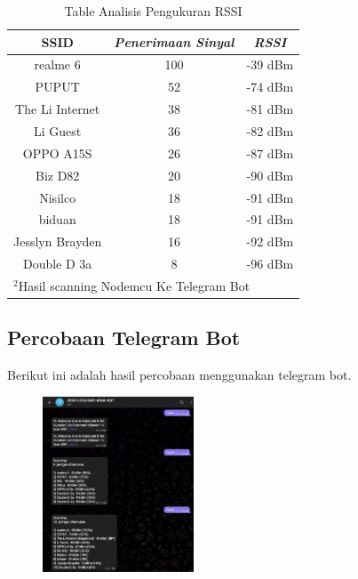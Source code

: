 \documentclass[conference]{IEEEtran}
\begin{document}
 \begin{table}[htbp]
    \caption{Table Analisis Pengukuran RSSI}
    \begin{center}
    \begin{tabular}{|c|c|c|}
        \hline
    \textbf{SSID} &  \textbf{\textit{Penerimaan Sinyal}}& \textbf{\textit{RSSI}} \\
    \hline
    realme 6 & 100 & -39 dBm   \\
    \hline
    PUPUT & 52 & -74 dBm   \\
    \hline
    The Li Internet & 38 & -81 dBm   \\
    \hline
    Li Guest  & 36 & -82 dBm   \\
    \hline
    OPPO A15S  & 26 & -87 dBm   \\
    \hline
    Biz D82  & 20 & -90 dBm   \\
    \hline
    Nisilco  & 18 & -91 dBm   \\
    \hline
    biduan  & 18 & -91 dBm   \\
    \hline
    Jesslyn Brayden  & 16 & -92 dBm   \\
    \hline
    Double D 3a  & 8 & -96 dBm   \\
    \hline

    \multicolumn{3}{l}{$^{\mathrm{2}}$Hasil scanning Nodemcu Ke Telegram Bot}
    \end{tabular}
    \label{tab2}
    \end{center}
    \end{table}


    \subsection{Percobaan Telegram Bot}
    Berikut ini adalah hasil percobaan menggunakan telegram bot.
    \begin{figure}[h]
        \centering
        \includegraphics[width=0.4\textwidth]{telebott.png}
    \end{figure}
    \vspace{4cm}
\end{document}
